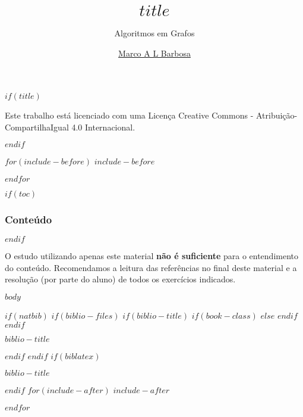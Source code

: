 \documentclass[$if(fontsize)$$fontsize$,$endif$$if(handout)$handout,$endif$$if(beamer)$ignorenonframetext,$endif$$for(classoption)$$classoption$$sep$,$endfor$]{$documentclass$}
\title{$title$}
\subtitle{Algoritmos em Grafos}
\author{\href{malbarbo.pro.br}{Marco A L Barbosa}}
\date{}
\begin{document}
$if(title)$
\begin{frame}[plain]
  \vspace{1.5cm}
  \titlepage
  \begin{center} 
    \href{http://creativecommons.org/licenses/by-sa/4.0/}{\ccbysa}

    {\tiny
      Este trabalho está licenciado com uma Licença Creative Commons -
      Atribuição-CompartilhaIgual 4.0 Internacional.
    }
  \end{center}
\end{frame}
$endif$

$for(include-before)$
$include-before$

$endfor$

$if(toc)$
\begin{frame}[plain]
  \frametitle{Conteúdo}
  \tableofcontents
\end{frame}
$endif$

\begin{frame}

  O estudo utilizando apenas este material \textbf{não é suficiente} para o
  entendimento do conteúdo. Recomendamos a leitura das referências no final
  deste material e a resolução (por parte do aluno) de todos os exercícios
  indicados.

\end{frame}

$body$

$if(natbib)$
$if(biblio-files)$
$if(biblio-title)$
$if(book-class)$
\renewcommand\bibname{$biblio-title$}
$else$
\renewcommand\refname{$biblio-title$}
$endif$
$endif$
\begin{frame}[allowframebreaks]{$biblio-title$}

\end{frame}

$endif$
$endif$
$if(biblatex)$
\begin{frame}[allowframebreaks]{$biblio-title$}
\printbibliography[heading=none]
\end{frame}

$endif$
$for(include-after)$
$include-after$

$endfor$
\end{document}
